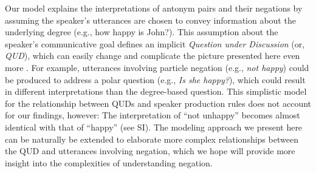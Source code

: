 \documentclass[floatsintext,doc]{apa6}
\begin{document}
Our model explains the interpretations of antonym pairs and their negations by assuming the speaker's utterances are chosen to convey information about the underlying degree (e.g., how happy is John?). This assumption about the speaker's communicative goal defines an implicit \emph{Question under Discussion} (or, \emph{QUD}), which can easily change and complicate the picture presented here even more \cite{roberts2012information, beaver2017questions}. For example, utterances involving particle negation (e.g., \emph{not happy}) could be produced to address a polar question (e.g., \emph{Is she happy?}), which could result in different interpretations than the degree-based question. 
This simplistic model for the relationship between QUDs and speaker production rules does not account for our findings, however: The interpretation of ``not unhappy'' becomes almost identical with that of ``happy'' (see SI).
The modeling approach we present here can be naturally be extended to elaborate more complex relationships between the QUD and utterances involving negation, which we hope will provide more insight into the complexities of understanding negation. 

%
\end{document}
